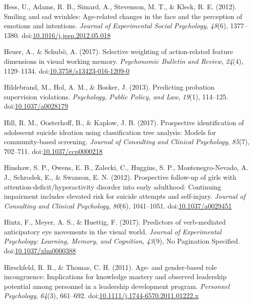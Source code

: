 \documentclass[english,man]{apa6}
\begin{document}
\hypertarget{ref-Hess2012}{}
Hess, U., Adams, R. B., Simard, A., Stevenson, M. T., \& Kleck, R. E.
(2012). Smiling and sad wrinkles: Age-related changes in the face and
the perception of emotions and intentions. \emph{Journal of Experimental
Social Psychology}, \emph{48}(6), 1377--1380.
doi:\href{https://doi.org/10.1016/j.jesp.2012.05.018}{10.1016/j.jesp.2012.05.018}

\hypertarget{ref-Heuer2016}{}
Heuer, A., \& Schubö, A. (2017). Selective weighting of action-related
feature dimensions in visual working memory. \emph{Psychonomic Bulletin
and Review}, \emph{24}(4), 1129--1134.
doi:\href{https://doi.org/10.3758/s13423-016-1209-0}{10.3758/s13423-016-1209-0}

\hypertarget{ref-Hildebrand2013}{}
Hildebrand, M., Hol, A. M., \& Bosker, J. (2013). Predicting probation
supervision violations. \emph{Psychology, Public Policy, and Law},
\emph{19}(1), 114--125.
doi:\href{https://doi.org/10.1037/a0028179}{10.1037/a0028179}

\hypertarget{ref-Hill2017}{}
Hill, R. M., Oosterhoff, B., \& Kaplow, J. B. (2017). Prospective
identification of adolescent suicide ideation using classification tree
analysis: Models for community-based screening. \emph{Journal of
Consulting and Clinical Psychology}, \emph{85}(7), 702--711.
doi:\href{https://doi.org/10.1037/ccp0000218}{10.1037/ccp0000218}

\hypertarget{ref-Hinshaw2012}{}
Hinshaw, S. P., Owens, E. B., Zalecki, C., Huggins, S. P.,
Montenegro-Nevado, A. J., Schrodek, E., \& Swanson, E. N. (2012).
Prospective follow-up of girls with attention-deficit/hyperactivity
disorder into early adulthood: Continuing impairment includes elevated
risk for suicide attempts and self-injury. \emph{Journal of Consulting
and Clinical Psychology}, \emph{80}(6), 1041--1051.
doi:\href{https://doi.org/10.1037/a0029451}{10.1037/a0029451}

\hypertarget{ref-Hintz2017}{}
Hintz, F., Meyer, A. S., \& Huettig, F. (2017). Predictors of
verb-mediated anticipatory eye movements in the visual world.
\emph{Journal of Experimental Psychology: Learning, Memory, and
Cognition}, \emph{43}(9), No Pagination Specified.
doi:\href{https://doi.org/10.1037/xlm0000388}{10.1037/xlm0000388}

\hypertarget{ref-Hirschfeld2011}{}
Hirschfeld, R. R., \& Thomas, C. H. (2011). Age- and gender-based role
incongruence: Implications for knowledge mastery and observed leadership
potential among personnel in a leadership development program.
\emph{Personnel Psychology}, \emph{64}(3), 661--692.
doi:\href{https://doi.org/10.1111/j.1744-6570.2011.01222.x}{10.1111/j.1744-6570.2011.01222.x}
\end{document}
